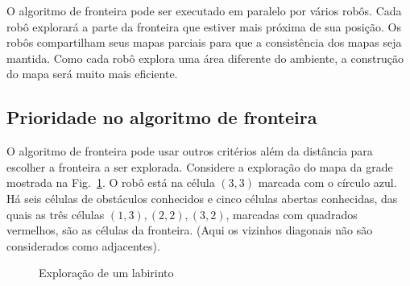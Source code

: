 O algoritmo de fronteira pode ser executado em paralelo por vários robôs. Cada robô explorará a parte da fronteira que estiver mais próxima de sua posição. Os robôs compartilham seus mapas parciais para que a consistência dos mapas seja mantida. Como cada robô explora uma área diferente do ambiente, a construção do mapa será muito mais eficiente.

\subsection{Prioridade no algoritmo de fronteira}\label{s.priority}

O algoritmo de fronteira pode usar outros critérios além da distância para escolher a fronteira a ser explorada. Considere a exploração do mapa da grade mostrada na Fig.~\ref{fig.map-seven}. O robô está na célula $(3,3)$ marcada com o círculo azul. Há seis células de obstáculos conhecidos e cinco células abertas conhecidas, das quais as três células $(1,3), (2,2), (3,2)$, marcadas com quadrados vermelhos, são as células da fronteira. (Aqui os vizinhos diagonais não são considerados como adjacentes).

\begin{figure}
\begin{center}
\caption{Exploração de um labirinto}\label{fig.map-seven}
\end{center}
\end{figure}


